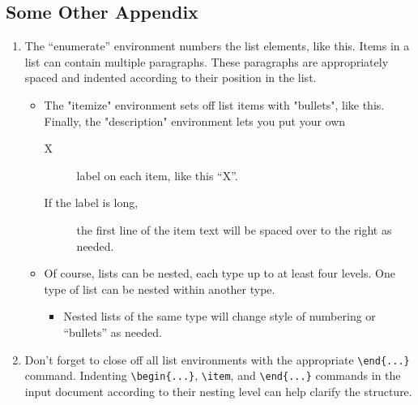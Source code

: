\documentclass[12pt,a4paper]{mvgl}
\begin{document}
\begin{mvglReport}
\section{Some Other Appendix}
\begin{enumerate}
\item
The ``enumerate'' environment numbers the list elements, like this.
Items in a list can contain multiple paragraphs.
These paragraphs are appropriately spaced and indented according to their
position in the list.
\begin{itemize}
\item The "itemize" environment sets off list items with "bullets",
like this. Finally, the "description" environment lets you put your own
\begin{description}
\item[X] label on each item, like this ``X''.
\item[If the label is long,] the first line of the item text will
be spaced over to the right as needed.
\end{description} 
\item Of course, lists can be nested, each type up to at least four levels.
One type of list can be nested within another type.
\begin{itemize}
\item Nested lists of the same type will change style of numbering
or ``bullets'' as needed.
\end{itemize}
\end{itemize}
\item Don't forget to close off all list environments with the
appropriate \verb+\end{...}+ command.
Indenting \verb+\begin{...}+, \verb+\item+, and \verb+\end{...}+
commands in the input document according to their nesting level can help
clarify the structure.
\end{enumerate} 

\end{mvglReport}
\end{document}
